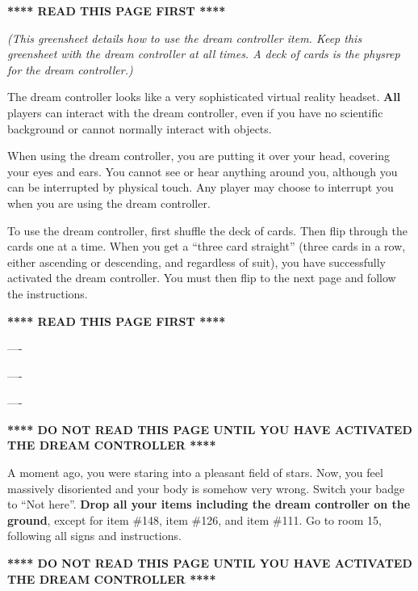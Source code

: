 \documentclass[green]{guildcamp1}
\begin{document}
\name{\gDreamController{}}

\textbf{**** READ THIS PAGE FIRST ****}

\emph{(This greensheet details how to use the dream controller item. Keep this greensheet with the dream controller at all times. A deck of cards is the physrep for the dream controller.)}

The dream controller looks like a very sophisticated virtual reality headset. \textbf{All} players can interact with the dream controller, even if you have no scientific background or cannot normally interact with objects.

When using the dream controller, you are putting it over your head, covering your eyes and ears. You cannot see or hear anything around you, although you can be interrupted by physical touch. Any player may choose to interrupt you when you are using the dream controller.

To use the dream controller, first shuffle the deck of cards. Then flip through the cards one at a time. When you get a ``three card straight'' (three cards in a row, either ascending or descending, and regardless of suit), you have successfully activated the dream controller. You must then flip to the next page and follow the instructions.

\textbf{**** READ THIS PAGE FIRST ****}

----

----

----

\textbf{**** DO NOT READ THIS PAGE UNTIL YOU HAVE ACTIVATED THE DREAM CONTROLLER ****}

A moment ago, you were staring into a pleasant field of stars. Now, you feel massively disoriented and your body is somehow very wrong. Switch your badge to ``Not here''. \textbf{Drop all your items including the dream controller on the ground}, except for item \#148, item \#126, and item \#111. Go to room 15, following all signs and instructions.

\textbf{**** DO NOT READ THIS PAGE UNTIL YOU HAVE ACTIVATED THE DREAM CONTROLLER ****}
\end{document}
